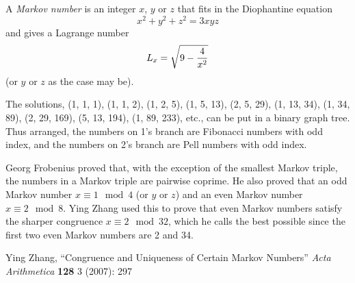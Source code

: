 \documentclass[12pt]{article}
\begin{document}
A \emph{Markov number} is an integer $x$, $y$ or $z$ that fits in the Diophantine equation $$x^2 + y^2 + z^2 = 3xyz$$ and gives a Lagrange number $$L_x = \sqrt{9 - {4 \over x^2}}$$ (or $y$ or $z$ as the case may be).

The solutions, (1, 1, 1), (1, 1, 2), (1, 2, 5), (1, 5, 13), (2, 5, 29), (1, 13, 34), (1, 34, 89), (2, 29, 169), (5, 13, 194), (1, 89, 233), etc., can be put in a binary graph tree. Thus arranged, the numbers on 1's branch are Fibonacci numbers with odd index, and the numbers on 2's branch are Pell numbers with odd index.

Georg Frobenius proved that, with the exception of the smallest Markov triple, the numbers in a Markov triple are pairwise coprime. He also proved that an odd Markov number $x \equiv 1 \mod 4$ (or $y$ or $z$) and an even Markov number $x \equiv 2 \mod 8$. Ying Zhang used this to prove that even Markov numbers satisfy the sharper congruence $x \equiv 2 \mod 32$, which he calls the best possible since the first two even Markov numbers are 2 and 34.

\begin{thebibliography}{1}
 Ying Zhang, ``Congruence and Uniqueness of Certain Markov Numbers'' {\it Acta Arithmetica} {\bf 128} 3 (2007): 297
\end{thebibliography}
\end{document}
